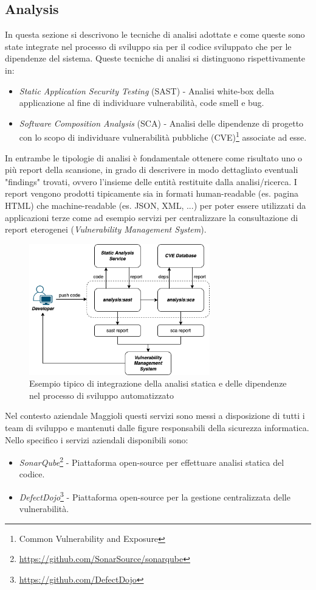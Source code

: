 \subsection{Analysis}
In questa sezione si descrivono le tecniche di analisi adottate e come queste sono state integrate nel processo di sviluppo sia per il codice sviluppato che per le dipendenze del sistema. Queste tecniche di analisi si distinguono rispettivamente in:
\begin{itemize}
    \item \textit{Static Application Security Testing} (SAST) - Analisi white-box della applicazione al fine di individuare vulnerabilità, code smell e bug.
    \item \textit{Software Composition Analysis} (SCA) - Analisi delle dipendenze di progetto con lo scopo di individuare vulnerabilità pubbliche (CVE)\footnote{Common Vulnerability and Exposure} associate ad esse.
\end{itemize}
In entrambe le tipologie di analisi è fondamentale ottenere come risultato uno o più report della scansione, in grado di descrivere in modo dettagliato eventuali "findings" trovati, ovvero l'insieme delle entità restituite dalla analisi/ricerca. I report vengono prodotti tipicamente sia in formati human-readable (es. pagina HTML) che machine-readable (es. JSON, XML, ...) per poter essere utilizzati da applicazioni terze come ad esempio servizi per centralizzare la consultazione di report eterogenei (\textit{Vulnerability Management System}).

\begin{figure}[H]
\centering
\includegraphics[width=0.7\textwidth]{img/tesi-12-sastsca.drawio.png}
\caption{Esempio tipico di integrazione della analisi statica e delle dipendenze nel processo di sviluppo automatizzato}
\end{figure}

Nel contesto aziendale Maggioli questi servizi sono messi a disposizione di tutti i team di sviluppo e mantenuti dalle figure responsabili della sicurezza informatica. Nello specifico i servizi aziendali disponibili sono:
\begin{itemize}
    \item \textit{SonarQube}\footnote{\url{https://github.com/SonarSource/sonarqube}} - Piattaforma open-source per effettuare analisi statica del codice.
    \item \textit{DefectDojo}\footnote{\url{https://github.com/DefectDojo}} - Piattaforma open-source per la gestione centralizzata delle vulnerabilità.
\end{itemize}

